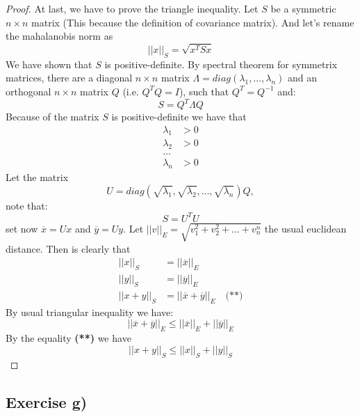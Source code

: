 \documentclass{article}
\theoremstyle{definition}
\theoremstyle{remark}
\theoremstyle{remark}
\theoremstyle{example}
\begin{document}
\begin{proof}
At last, we have to prove the triangle inequality. Let $S$ be a symmetric $n \times n$ matrix (This because the definition of covariance matrix). And let's rename the mahalanobis norm as
\[
||x||_{S} = \sqrt{x^{T}Sx}
\]
We have shown that $S$ is positive-definite. By spectral theorem for symmetrix matrices, there are a diagonal $n \times n$ matrix $\Lambda = diag(\lambda_{1},\ldots,\lambda_{n})$ and an orthogonal $n \times n$ matrix $Q$ (i.e. $Q^{T}Q = I$), such that $Q^{T} = Q^{-1}$ and:
\[
S = Q^{T} \Lambda Q
\]
Because of the matrix $S$ is positive-definite we have that
\begin{align*}
    \lambda_{1} &> 0 \\
    \lambda_{2} &> 0 \\
    \ldots \\
    \lambda_{n} &> 0
\end{align*}
Let the matrix
\[
U = diag(\sqrt{\lambda_{1}},\sqrt{\lambda_{2}},\ldots,\sqrt{\lambda_{n}})Q,
\]
note that:
\[
S = U^{T}U
\]
set now $\overline{x} = Ux$ and $\overline{y} = Uy$. Let $||v||_{E} = \sqrt{v_{1}^{2} + v_{2}^{2} + \ldots + v_{n}^{n}}$ the usual euclidean distance. Then is clearly that
\begin{align*}
    ||x||_{S} &= ||\overline{x}||_{E} \\
    ||y||_{S} &= ||\overline{y}||_{E} \\
    ||x+y||_{S} &= ||\overline{x} + \overline{y}||_{E} \quad \textbf{(**)}
\end{align*}
By usual triangular inequality we have:
\[
||\overline{x} + \overline{y}||_{E} \leq ||\overline{x}||_{E} + ||\overline{y}||_{E}
\]
By the equality \textbf{(**)} we have
\[
||x + y||_{S} \leq ||x||_{S} + ||y||_{S}
\]
\end{proof}


\subsection*{Exercise g)} 
\end{document}
